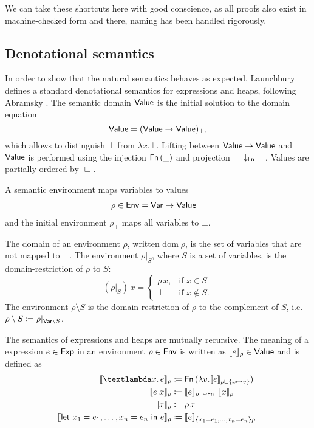 \documentclass{jfp1}
\theoremstyle{nonumberbreak}
\newcommand{\sVar}  {\text{\textsf{Var}}}
\newcommand{\sExp}  {\text{\textsf{Exp}}}
\newcommand{\sValue}{\text{\textsf{Value}}}
\newcommand{\sEnv}  {\text{\textsf{Env}}}
\newcommand{\sFn}[1]{\text{\textsf{Fn}}\,(#1)}
\newcommand{\sFnProj}[2]{#1\,\downarrow_{\text{\textsf{Fn}}}\,#2}
\newcommand{\sApp}[2]{#1\;#2}
\newcommand{\sLam}[2]{\text{\textlambda} #1.\, #2}
\newcommand{\sLet}[2]{\text{\textsf{let}}\ #1\ \text{\textsf{in}}\ #2}
\newcommand{\dom}[1]{\text{dom}\;#1}
\newcommand{\xeng}{x_1 = e_1, \ldots, x_n = e_n}
\newcommand{\dsem}[2]{\llbracket #1 \rrbracket_{#2}}
\newcommand{\esem}[1]{\{\!\!\!\{#1\}\!\!\!\}}
\begin{document}
We can take these shortcuts here with good conscience, as all proofs also exist in machine-checked form and there, naming has been handled rigorously.

\subsection{Denotational semantics}

In order to show that the natural semantics behaves as expected, Launchbury defines a standard denotational semantics for expressions and heaps, following Abramsky . The semantic domain $\sValue$ is the initial solution to the domain equation 
\[
\sValue = (\sValue \to \sValue)_\bot,
\]
which allows to distinguish $\bot$ from $\lambda x. \bot$. Lifting between $\sValue \to \sValue$ and $\sValue$ is performed using the injection $\sFn \_$ and projection $\sFnProj{\_}{\_}$. Values are partially ordered by $\sqsubseteq$.

A semantic environment maps variables to values
\begin{alignat*}{2}
\rho \in \sEnv &= \sVar \to \sValue
\end{alignat*}
and the initial environment $\rho_\bot$ maps all variables to $\bot$.

The domain of an environment $\rho$, written $\dom\rho$, is the set of variables that are not mapped to $\bot$.
The environment $\rho|_S$, where $S$ is a set of variables, is the domain-restriction of $\rho$ to $S$:
\[
(\rho |_S)\, x = 
\begin{cases}
\rho\, x,& \text{if } x \in S\\
\bot& \text{if } x \not\in S.
\end{cases}
\]
The environment $\rho\setminus S$ is the domain-restriction of $\rho$ to the complement of $S$, i.e.\ \mbox{$\rho\setminus S \coloneqq \rho|_{\sVar \setminus S}$}.

The semantics of expressions and heaps are mutually recursive. The meaning of a expression $e \in \sExp$ in an environment $\rho \in \sEnv$ is written as $\dsem e \rho \in \sValue$ and is defined as
\begin{align*}
\dsem{\sLam x e}\rho &\coloneqq \sFn{\lambda v. \dsem e {\rho \sqcup \{x \mapsto v\}}}\\
\dsem{\sApp e  x}\rho &\coloneqq \sFnProj {\dsem e \rho}{\dsem x \rho}\\
\dsem{x}\rho &\coloneqq \rho\,x\\
\dsem{\sLet{\xeng}e}\rho &\coloneqq \dsem e {\esem{\xeng}\rho.}
\end{align*}
\end{document}
